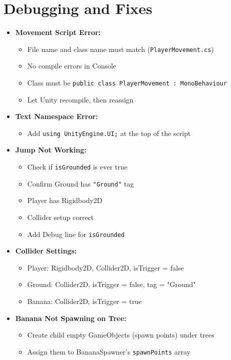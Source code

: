 \documentclass[11pt]{article}
\begin{document}
	\section*{Debugging and Fixes}
	\begin{itemize}
		\item \textbf{Movement Script Error:}
		\begin{itemize}
			\item File name and class name must match (\texttt{PlayerMovement.cs})
			\item No compile errors in Console
			\item Class must be \texttt{public class PlayerMovement : MonoBehaviour}
			\item Let Unity recompile, then reassign
		\end{itemize}
		\item \textbf{Text Namespace Error:}
		\begin{itemize}
			\item Add \texttt{using UnityEngine.UI;} at the top of the script
		\end{itemize}
		\item \textbf{Jump Not Working:}
		\begin{itemize}
			\item Check if \texttt{isGrounded} is ever true
			\item Confirm Ground has \texttt{"Ground"} tag
			\item Player has Rigidbody2D
			\item Collider setup correct
			\item Add Debug line for \texttt{isGrounded}
		\end{itemize}
		\item \textbf{Collider Settings:}
		\begin{itemize}
			\item Player: Rigidbody2D, Collider2D, isTrigger = false
			\item Ground: Collider2D, isTrigger = false, tag = "Ground"
			\item Banana: Collider2D, isTrigger = true
		\end{itemize}
		\item \textbf{Banana Not Spawning on Tree:}
		\begin{itemize}
			\item Create child empty GameObjects (spawn points) under trees
			\item Assign them to BananaSpawner's \texttt{spawnPoints} array
		\end{itemize}

\end{itemize}
\end{document}
